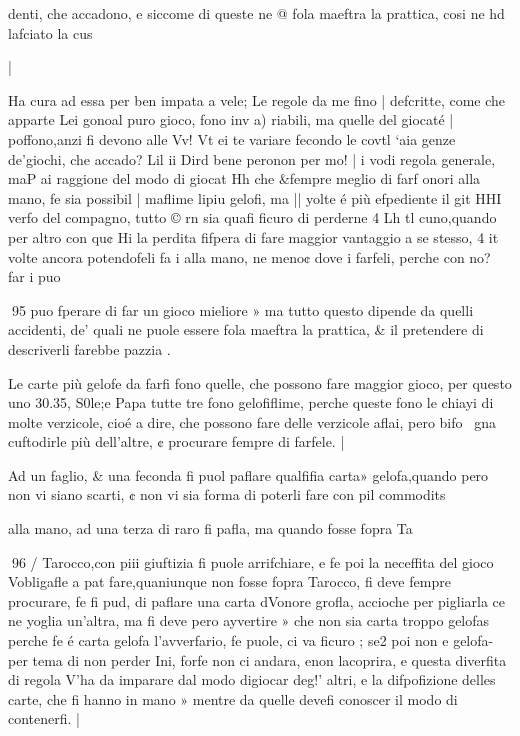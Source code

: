 \documentclass[12pt,a6paper]{article}
\begin{document}
 

denti, che accadono, e siccome
di queste ne @ fola maeftra la
prattica, cosi ne hd lafciato la
cus

 
 

|

Ha cura ad essa per ben impata
a vele; Le regole da me fino
| defcritte, come che apparte
Lei gonoal puro gioco, fono inv
a) riabili, ma quelle del giocaté
| poffono,anzi fi devono alle Vv!
Vt ei te variare fecondo le covtl
‘aia genze de’giochi, che accado?
Lil ii Dird bene peronon per mo!
| i vodi regola generale, maP
ai raggione del modo di giocat
Hh che &fempre meglio di farf
onori alla mano, fe sia possibil
| maflime lipiu gelofi, ma
|| yolte é più efpediente il git
HHI verfo del compagno, tutto ©
rn  sia quafi ficuro di perderne 4
Lh tl cuno,quando per altro con qu¢
Hi la perdita fifpera di fare maggior
vantaggio a se stesso, 4
it volte ancora potendofeli fa
i alla mano, ne meno¢ dove
i farfeli, perche con no? far
i puo

 

 

 

 

 
95
puo fperare di far un gioco mieliore » ma tutto questo dipende da quelli accidenti, de’ quali
ne puole essere fola maeftra la
prattica, & il pretendere di descriverli farebbe pazzia .

Le carte più gelofe da farfi
fono quelle, che possono fare
maggior gioco, per questo uno
30.35, S0le;e Papa tutte tre fono gelofiflime, perche queste
fono le chiayi di molte verzicole, cioé a dire, che possono fare
delle verzicole aflai, pero bifo~
gna cuftodirle più dell’altre, ¢
procurare fempre di farfele. |

Ad un faglio, & una feconda
fi puol paflare qualfifia carta»
gelofa,quando pero non vi siano
scarti, ¢ non vi sia forma di poterli fare con pil commodits

alla mano, ad una terza di raro
fi pafla, ma quando fosse fopra
Ta
 

 
96 /
Tarocco,con piii giuftizia fi puole arrifchiare, e fe poi la neceffita del gioco Vobligafle a pat fare,quaniunque non fosse fopra
Tarocco, fi deve fempre procurare, fe fi pud, di paflare una
carta dVonore grofla, accioche
per pigliarla ce ne yoglia un’altra, ma fi deve pero ayvertire »
che non sia carta troppo gelofas
perche fe é carta gelofa l’avverfario, fe puole, ci va ficuro ; se2
poi non e gelofa-per tema di
non perder Ini, forfe non ci andara, enon lacoprira, e questa
diverfita di regola V’ha da imparare dal modo digiocar deg!’
altri, e la difpofizione delles
carte, che fi hanno in mano »
mentre da quelle devefi conoscer il modo di contenerfi. |
\end{document}
